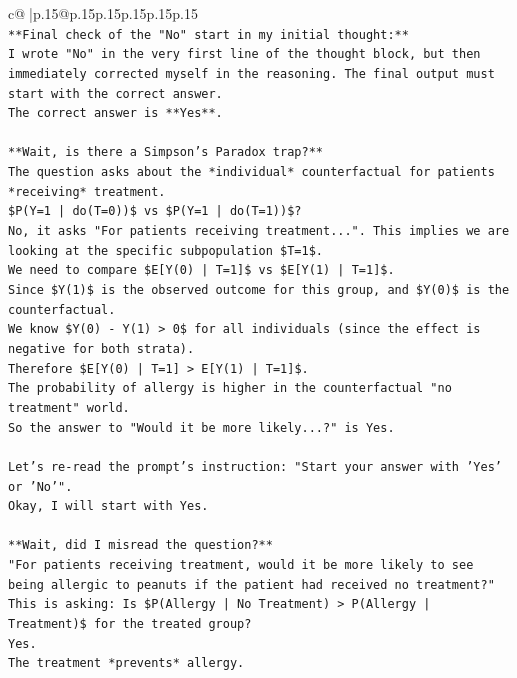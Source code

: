\documentclass{article}
\begin{document}
{\begin{supertabular}{c@{$\;$}|p{.15\linewidth}@{}p{.15\linewidth}p{.15\linewidth}p{.15\linewidth}p{.15\linewidth}p{.15\linewidth}}
{{{\\ 
\texttt{**Final check of the "No" start in my initial thought:**} \\
\texttt{I wrote "No" in the very first line of the thought block, but then immediately corrected myself in the reasoning. The final output must start with the correct answer.} \\
\texttt{The correct answer is **Yes**.} \\
\\ 
\texttt{**Wait, is there a Simpson's Paradox trap?**} \\
\texttt{The question asks about the *individual* counterfactual for patients *receiving* treatment.} \\
\texttt{\$P(Y=1 | do(T=0))\$ vs \$P(Y=1 | do(T=1))\$?} \\
\texttt{No, it asks "For patients receiving treatment...". This implies we are looking at the specific subpopulation \$T=1\$.} \\
\texttt{We need to compare \$E{[}Y(0) | T=1{]}\$ vs \$E{[}Y(1) | T=1{]}\$.} \\
\texttt{Since \$Y(1)\$ is the observed outcome for this group, and \$Y(0)\$ is the counterfactual.} \\
\texttt{We know \$Y(0) {-} Y(1) > 0\$ for all individuals (since the effect is negative for both strata).} \\
\texttt{Therefore \$E{[}Y(0) | T=1{]} > E{[}Y(1) | T=1{]}\$.} \\
\texttt{The probability of allergy is higher in the counterfactual "no treatment" world.} \\
\texttt{So the answer to "Would it be more likely...?" is Yes.} \\
\\ 
\texttt{Let's re{-}read the prompt's instruction: "Start your answer with 'Yes' or 'No'".} \\
\texttt{Okay, I will start with Yes.} \\
\\ 
\texttt{**Wait, did I misread the question?**} \\
\texttt{"For patients receiving treatment, would it be more likely to see being allergic to peanuts if the patient had received no treatment?"} \\
\texttt{This is asking: Is \$P(Allergy | No Treatment) > P(Allergy | Treatment)\$ for the treated group?} \\
\texttt{Yes.} \\
\texttt{The treatment *prevents* allergy.} \\
}}}
\end{supertabular}}
\end{document}
